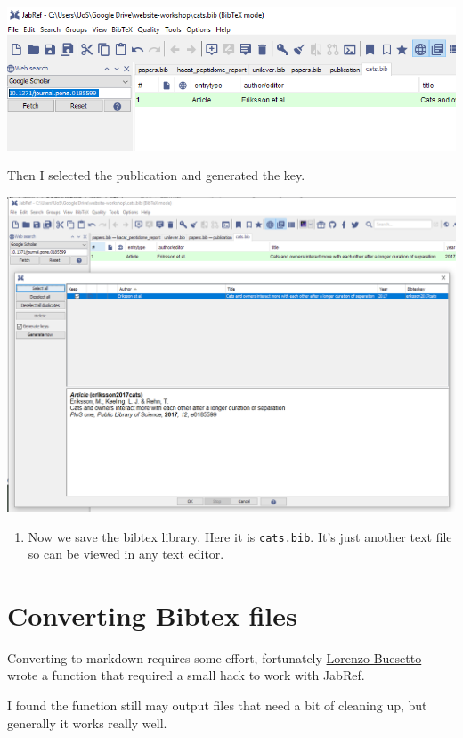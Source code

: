 \documentclass[12pt,]{book}
\providecommand{\tightlist}{%
  \setlength{\itemsep}{0pt}\setlength{\parskip}{0pt}}
\theoremstyle{definition}
\theoremstyle{definition}
\theoremstyle{definition}
\theoremstyle{remark}
\begin{document}
\includegraphics[width=1.2\linewidth]{img/jabref_websearch}

Then I selected the publication and generated the key.

\includegraphics[width=1.2\linewidth]{img/jabref_websearch_2}

\begin{enumerate}
\def\labelenumi{\arabic{enumi}.}
\setcounter{enumi}{5}
\tightlist
\item
  Now we save the bibtex library. Here it is \texttt{cats.bib}. It's
  just another text file so can be viewed in any text editor.
\end{enumerate}

\section{Converting Bibtex files}\label{converting-bibtex-files}

Converting to markdown requires some effort, fortunately
\href{https://lbusett.netlify.com/post/automatically-importing-publications-from-bibtex-to-a-hugo-academic-blog/}{Lorenzo
Buesetto} wrote a function that required a small hack to work with
JabRef.

I found the function still may output files that need a bit of cleaning
up, but generally it works really well.
\end{document}

